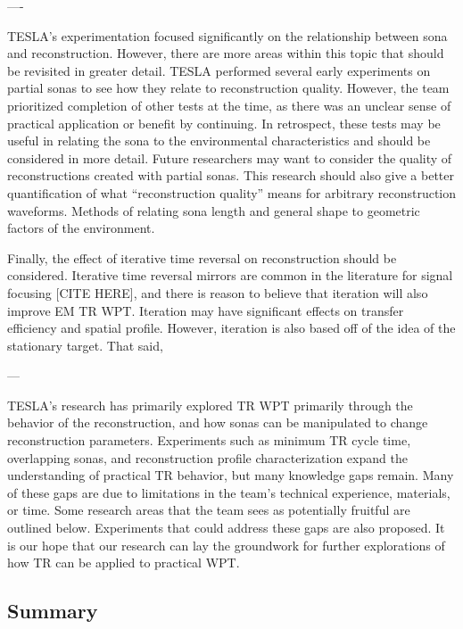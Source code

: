 ----

	TESLA’s experimentation focused significantly on the relationship between sona and reconstruction.  However, there are more areas within this topic that should be revisited in greater detail.  TESLA performed several early experiments on partial sonas to see how they relate to reconstruction quality.  However, the team prioritized completion of other tests at the time, as there was an unclear sense of practical application or benefit by continuing.  In retrospect, these tests may be useful in relating the sona to the environmental characteristics and should be considered in more detail.
	Future researchers may want to consider the quality of reconstructions created with partial sonas.  This research should also give a better quantification of what “reconstruction quality” means for arbitrary reconstruction waveforms.  Methods of relating sona length and general shape to geometric factors of the environment.

	Finally, the effect of iterative time reversal on reconstruction should be considered.  Iterative time reversal mirrors are common in the literature for signal focusing [CITE HERE], and there is reason to believe that iteration will also improve EM TR WPT.  Iteration may have significant effects on transfer efficiency and spatial profile.  However, iteration is also based off of the idea of the stationary target.  That said, 

---

TESLA’s research has primarily explored TR WPT primarily through the behavior of the reconstruction, and how sonas can be manipulated to change reconstruction parameters.  Experiments such as minimum TR cycle time, overlapping sonas, and reconstruction profile characterization expand the understanding of practical TR behavior, but many knowledge gaps remain.  Many of these gaps are due to limitations in the team’s technical experience, materials, or time.  Some research areas that the team sees as potentially fruitful are outlined below.  Experiments that could address these gaps are also proposed.  It is our hope that our research can lay the groundwork for further explorations of how TR can be applied to practical WPT.



\subsection{Summary}

